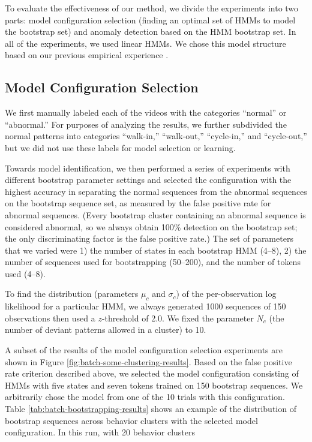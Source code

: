 To evaluate the effectiveness of our method, we divide the experiments
into two parts: model configuration selection (finding an optimal set
of HMMs to model the bootstrap set) and anomaly detection based on the
HMM bootstrap set. In all of the experiments, we used linear HMMs. We
chose this model structure based on our previous empirical
experience .

\subsection{Model Configuration Selection}
\label{sec:batch-model-config}

We first manually labeled each of the videos with the categories
``normal'' or ``abnormal.''  For purposes of analyzing the results, we
further subdivided the normal patterns into categories ``walk-in,''
``walk-out,'' ``cycle-in,'' and ``cycle-out,'' but we did not use
these labels for model selection or learning.

Towards model identification, we then performed a series of
experiments with different bootstrap parameter settings and selected
the configuration with the highest accuracy in separating the normal
sequences from the abnormal sequences on the bootstrap sequence set,
as measured by the false positive rate for abnormal sequences.  (Every
bootstrap cluster containing an abnormal sequence is considered
abnormal, so we always obtain 100\% detection on the bootstrap set;
the only discriminating factor is the false positive rate.)  The set
of parameters that we varied were 1) the number of states in each
bootstrap HMM (4--8), 2) the number of sequences used for
bootstrapping (50--200), and the number of tokens used (4--8).

To find the distribution (parameters $\mu_c$ and $\sigma_c$) of the
per-observation log likelihood for a particular HMM, we always
generated 1000 sequences of 150 observations then used a $z$-threshold
of 2.0. We fixed the parameter $N_c$ (the number of deviant patterns
allowed in a cluster) to 10.

A subset of the results of the model configuration selection
experiments are shown in
Figure \ref{fig:batch-some-clustering-results}. Based on the false
positive rate criterion described above, we selected the model
configuration consisting of HMMs with five states and seven tokens
trained on 150 bootstrap sequences.  We arbitrarily chose the model
from one of the 10 trials with this configuration.
Table \ref{tab:batch-bootstrapping-results} shows an example of the
distribution of bootstrap sequences across behavior clusters with the
selected model configuration. In this run, \DIFdelbegin {}\DIFdelend \DIFaddbegin {}\DIFaddend with 20 behavior 
clusters\DIFdelbegin {}\DIFdelend \DIFaddbegin {}

